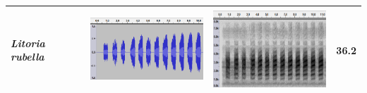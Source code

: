 \begin{table}[htb!]
\begin{tabular}{llll}
\textit{Litoria rubella}     &   \begin{minipage}{.3\textwidth} \includegraphics[width=45mm, height=30mm]{image/Ch1/rubella_wav.png}   \end{minipage}    &       \begin{minipage}{.3\textwidth} \includegraphics[width=45mm, height=30mm]{image/Ch1/rubella_spec.png}   \end{minipage}   & 36.2  \\ \hline\hline
\end{tabular}
\end{table}





